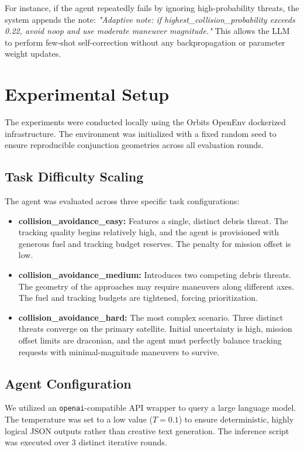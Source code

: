 \documentclass[10pt,journal,compsoc]{IEEEtran}
\begin{document}
For instance, if the agent repeatedly fails by ignoring high-probability threats, the system appends the note: \textit{"Adaptive note: if highest\_collision\_probability exceeds 0.22, avoid noop and use moderate maneuver magnitude."} This allows the LLM to perform few-shot self-correction without any backpropagation or parameter weight updates.

\section{Experimental Setup}

The experiments were conducted locally using the Orbits OpenEnv dockerized infrastructure. The environment was initialized with a fixed random seed to ensure reproducible conjunction geometries across all evaluation rounds.

\subsection{Task Difficulty Scaling}
The agent was evaluated across three specific task configurations:
\begin{itemize}
    \item \textbf{collision\_avoidance\_easy:} Features a single, distinct debris threat. The tracking quality begins relatively high, and the agent is provisioned with generous fuel and tracking budget reserves. The penalty for mission offset is low.
    \item \textbf{collision\_avoidance\_medium:} Introduces two competing debris threats. The geometry of the approaches may require maneuvers along different axes. The fuel and tracking budgets are tightened, forcing prioritization.
    \item \textbf{collision\_avoidance\_hard:} The most complex scenario. Three distinct threats converge on the primary satellite. Initial uncertainty is high, mission offset limits are draconian, and the agent must perfectly balance tracking requests with minimal-magnitude maneuvers to survive.
\end{itemize}

\subsection{Agent Configuration}
We utilized an \texttt{openai}-compatible API wrapper to query a large language model. The temperature was set to a low value ($T=0.1$) to ensure deterministic, highly logical JSON outputs rather than creative text generation. The inference script was executed over 3 distinct iterative rounds.
\end{document}
